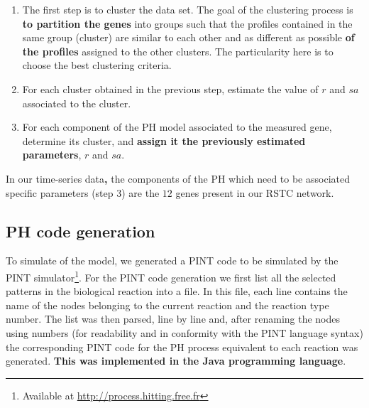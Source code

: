 \documentclass[11pt,a4paper,twoside]{epig}
\begin{document}
\begin{enumerate}
 \item The first step is to cluster the data set. The goal of the clustering process is \textbf{to partition the genes} into groups such that the 
 profiles contained in the same group (cluster) are similar to each other and as different as possible \textbf{of the profiles} assigned to the other
 clusters. The particularity here is to choose the best clustering criteria.
 \item For each cluster obtained in the previous step, estimate the value of $r$ and $sa$ associated to the cluster.
 \item For each component of the PH model associated to the measured gene, determine its cluster, and \textbf{assign it the previously  estimated  parameters}, $r$ and $sa$.
\end{enumerate}

In our time-series data\textbf{,} the components of the PH which need to be associated specific parameters (step 3) are the $12$ genes present in our RSTC network.


\subsection{PH code generation}

To simulate of the model, we generated a PINT code to be simulated by the PINT simulator\footnote{Available at \url{http://process.hitting.free.fr}}. For the PINT code 
generation we first list all the selected patterns in the biological reaction into a file. In this file, each line contains the 
name of the nodes belonging to the current reaction and the reaction type number. The list was then parsed, line by line and, 
after renaming the nodes using numbers (for readability and in conformity with the PINT language syntax) the corresponding PINT code
for the PH process equivalent to each reaction was generated. \textbf{This was implemented in the Java programming language}.
\end{document}

